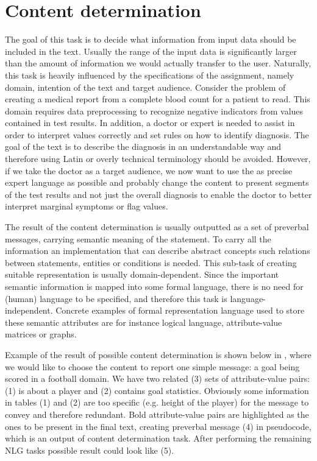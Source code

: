 \section{Content determination}
The goal of this task is to decide what information from input data should be included in the text. Usually the range of the input data is significantly larger than the amount of information we would actually transfer to the user. Naturally, this task is heavily influenced by the specifications of the assignment, namely domain, intention of the text and target audience. Consider the problem of creating a medical report from a complete blood count for a patient to read. This domain requires data preprocessing to recognize negative indicators from values contained in test results. In addition, a doctor or expert is needed to assist in order to interpret values correctly and set rules on how to identify diagnosis. The goal of the text is to describe the diagnosis in an understandable way and therefore using Latin or overly technical terminology should be avoided. However, if we take the doctor as a target audience, we now want to use the as precise expert language as possible and probably change the content to present segments of the test results and not just the overall diagnosis to enable the doctor to better interpret marginal symptoms or flag values.

The result of the content determination is usually outputted as a set of preverbal messages, carrying semantic meaning of the statement. To carry all the information an implementation that can describe abstract concepts such relations between statements, entities or conditions is needed. This sub-task of creating suitable representation is usually domain-dependent. Since the important semantic information is mapped into some formal language, there is no need for (human) language to be specified, and therefore this task is language-independent. Concrete examples of formal representation language used to store these semantic attributes are for instance logical language, attribute-value matrices or graphs.

Example of the result of possible content determination is shown below in , where we would like to choose the content to report one simple message: a goal being scored in a football domain. We have two related (3) sets of attribute-value pairs: (1) is about a player and (2) contains goal statistics. Obviously some information in tables (1) and (2) are too specific (e.g. height of the player) for the message to convey and therefore redundant. Bold attribute-value pairs are highlighted as the ones to be present in the final text, creating preverbal message (4) in pseudocode, which is an output of content determination task. After performing the remaining NLG tasks possible result could look like (5). 


